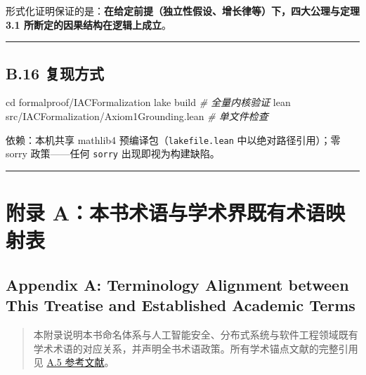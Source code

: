 \documentclass[
]{ctexart}
\newenvironment{Shaded}{}{}
\newcommand{\CommentTok}[1]{\textcolor[rgb]{0.38,0.63,0.69}{\textit{#1}}}
\newcommand{\FunctionTok}[1]{\textcolor[rgb]{0.02,0.16,0.49}{#1}}
\newcommand{\NormalTok}[1]{#1}
\newcommand{\OperatorTok}[1]{\textcolor[rgb]{0.40,0.40,0.40}{#1}}
\renewcommand{\_}{\discretionary{}{}{\textunderscore}}
\let\oldsection\section
\renewcommand{\section}{\clearpage\oldsection}
\begin{document}
形式化证明保证的是：\textbf{在给定前提（独立性假设、增长律等）下，四大公理与定理
3.1 所断定的因果结构在逻辑上成立}。

\begin{center}\rule{0.5\linewidth}{0.5pt}\end{center}

\subsection{B.16 复现方式}\label{b.16-ux590dux73b0ux65b9ux5f0f}

\begin{Shaded}
\begin{Highlighting}[]
\FunctionTok{cd}\NormalTok{ formal\_proof}\OperatorTok{/}\NormalTok{IACFormalization}
\NormalTok{lake build        }\CommentTok{\# 全量内核验证}
\NormalTok{lean src}\OperatorTok{/}\NormalTok{IACFormalization}\OperatorTok{/}\NormalTok{Axiom1\_Grounding}\OperatorTok{.}\FunctionTok{lean}   \CommentTok{\# 单文件检查}
\end{Highlighting}
\end{Shaded}

依赖：本机共享 mathlib4 预编译包（\texttt{lakefile.lean}
中以绝对路径引用）；零 sorry 政策------任何 \texttt{sorry}
出现即视为构建缺陷。

\begin{center}\rule{0.5\linewidth}{0.5pt}\end{center}

\section{附录
A：本书术语与学术界既有术语映射表}\label{ux9644ux5f55-aux672cux4e66ux672fux8bedux4e0eux5b66ux672fux754cux65e2ux6709ux672fux8bedux6620ux5c04ux8868}

\subsection{Appendix A: Terminology Alignment between This Treatise and
Established Academic
Terms}\label{appendix-a-terminology-alignment-between-this-treatise-and-established-academic-terms}

\begin{quote}
本附录说明本书命名体系与人工智能安全、分布式系统与软件工程领域既有学术术语的对应关系，并声明全书术语政策。所有学术锚点文献的完整引用见
\hyperref[a5-ux53c2ux8003ux6587ux732e-references]{A.5 参考文献}。
\end{quote}
\end{document}
